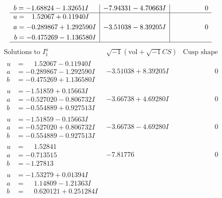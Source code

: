 \documentclass[1p]{elsarticle_modified}
\theoremstyle{definition}
\newcommand{\I}{\sqrt{-1}}
\begin{document}
$$\begin{array}{c|c|c}
\begin{aligned}
b &= -1.68824 - 1.32651 I\end{aligned}
 & -7.94331 - 4.70663 I & \phantom{-0.000000 } 0 \\ \hline\begin{aligned}
u &= \phantom{-}1.52067 + 0.11940 I \\
a &= -0.289867 + 1.292590 I \\
b &= -0.475269 - 1.136580 I\end{aligned}
 & -3.51038 - 8.39205 I & \phantom{-0.000000 } 0\\
 \hline 
 \end{array}$$\newpage$$\begin{array}{c|c|c}  
\text{Solutions to }I^u_{1}& \I (\text{vol} + \sqrt{-1}CS) & \text{Cusp shape}\\
 \hline 
\begin{aligned}
u &= \phantom{-}1.52067 - 0.11940 I \\
a &= -0.289867 - 1.292590 I \\
b &= -0.475269 + 1.136580 I\end{aligned}
 & -3.51038 + 8.39205 I & \phantom{-0.000000 } 0 \\ \hline\begin{aligned}
u &= -1.51859 + 0.15663 I \\
a &= -0.527020 - 0.806732 I \\
b &= -0.554889 + 0.927513 I\end{aligned}
 & -3.66738 + 4.69280 I & \phantom{-0.000000 } 0 \\ \hline\begin{aligned}
u &= -1.51859 - 0.15663 I \\
a &= -0.527020 + 0.806732 I \\
b &= -0.554889 - 0.927513 I\end{aligned}
 & -3.66738 - 4.69280 I & \phantom{-0.000000 } 0 \\ \hline\begin{aligned}
u &= \phantom{-}1.52841\phantom{ +0.000000I} \\
a &= -0.713515\phantom{ +0.000000I} \\
b &= -1.27813\phantom{ +0.000000I}\end{aligned}
 & -7.81776\phantom{ +0.000000I} & \phantom{-0.000000 } 0 \\ \hline\begin{aligned}
u &= -1.53279 + 0.01394 I \\
a &= \phantom{-}1.14809 - 1.21363 I \\
b &= \phantom{-}0.620121 + 0.251284 I\end{aligned}

\end{array}$$
\end{document}
